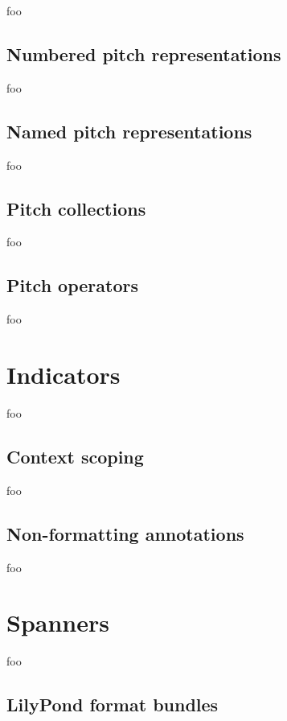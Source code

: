 foo

\subsection{Numbered pitch representations}

foo

\subsection{Named pitch representations}

foo

\subsection{Pitch collections}

foo

\subsection{Pitch operators}

foo

\section{Indicators}

foo

\subsection{Context scoping}

foo

\subsection{Non-formatting annotations}

foo

\section{Spanners}

foo

\subsection{LilyPond format bundles}


